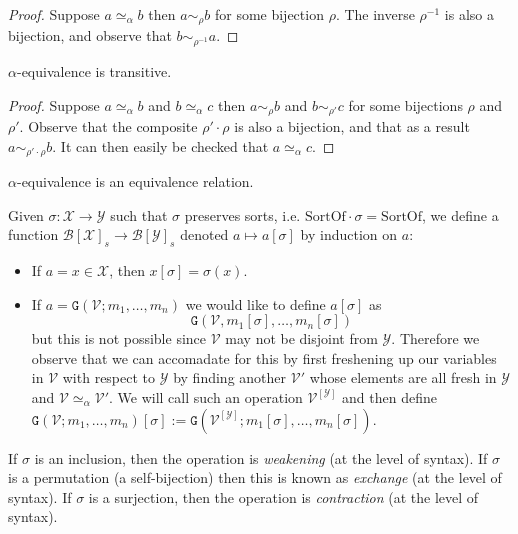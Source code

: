 \begin{proof}
    Suppose $a \simeq_\alpha b$ then $a \sim_\rho b$ for some bijection $\rho$. The inverse $\rho^{-1}$ is also a bijection, and observe that $b \sim_{\rho^{-1}} a$.
\end{proof}

\begin{lemma}
    $\alpha$-equivalence is transitive.
\end{lemma}

\begin{proof}
    Suppose $a \simeq_\alpha b$ and $b \simeq_\alpha c$ then $a \sim_\rho b$ and $b \sim_{\rho'} c$ for some bijections $\rho$ and $\rho'$. Observe that the composite $\rho' \cdot \rho$ is also a bijection, and that as a result $a \sim_{\rho' \cdot \rho} b$. It can then easily be checked that $a \simeq_\alpha c$.
\end{proof}

\begin{cor}
    $\alpha$-equivalence is an equivalence relation.
\end{cor}

\begin{defin}\label{sub}
    Given $\sigma : \mathcal{X} \to \mathcal{Y}$ such that $\sigma$ preserves sorts, i.e. $\mathrm{SortOf} \cdot \sigma = \mathrm{SortOf}$, we define a function $\mathcal{B}[\mathcal{X}]_s \to \mathcal{B}[\mathcal{Y}]_s$ denoted $a \mapsto a[\sigma]$ by induction on $a$:
    \begin{itemize}
        \item If $a = x \in \mathcal{X}$, then $x[\sigma] = \sigma(x)$.
        \item If $a = \mathtt{G}(\mathcal{V}; m_1, \dots , m_n)$ we would like to define $a[\sigma]$ as $$\mathtt{G}(\mathcal{V}, m_1[\sigma], \dots, m_n[\sigma])$$ but this is not possible since $\mathcal{V}$ may not be disjoint from $\mathcal{Y}$. Therefore we observe that we can accomadate for this by first freshening up our variables in $\mathcal{V}$ with respect to $\mathcal{Y}$ by finding another $\mathcal{V}'$ whose elements are all fresh in $\mathcal{Y}$ and $\mathcal{V} \simeq_{\alpha}\mathcal{V}'$. We will call such an operation $\mathcal{V}^{[\mathcal{Y}]}$ and then define $\mathtt{G}(\mathcal{V}; m_1 , \dots, m_n)[\sigma] := \mathtt{G}(\mathcal{V}^{[\mathcal{Y}]}; m_1[\sigma], \dots, m_n[\sigma])$. 
    \end{itemize}
    
    If $\sigma$ is an inclusion, then the operation is \emph{weakening} (at the level of syntax).
    If $\sigma$ is a permutation (a self-bijection) then this is known as \emph{exchange} (at the level of syntax).
    If $\sigma$ is a surjection, then the operation is \emph{contraction} (at the level of syntax).
\end{defin}

